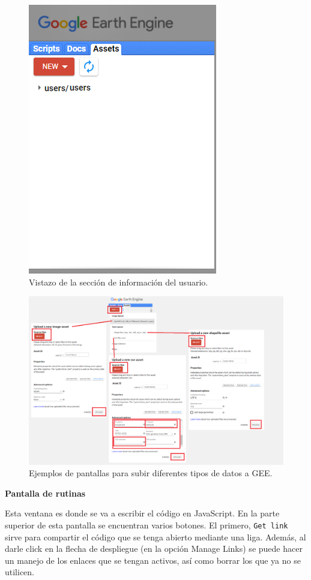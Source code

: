 \documentclass[
  12pt,
  letterpaper,
  twoside]{book}
\begin{document}
\begin{figure}

{\centering \includegraphics[width=0.4\linewidth]{Img/assets} 

}

\caption{Vistazo de la sección de información del usuario.}\label{fig:unnamed-chunk-12}
\end{figure}

\begin{figure}

{\centering \includegraphics[width=1\linewidth]{Img/newAssets} 

}

\caption{Ejemplos de pantallas para subir diferentes tipos de datos a GEE.}\label{fig:unnamed-chunk-13}
\end{figure}

\textbf{Pantalla de rutinas}

Esta ventana es donde se va a escribir el código en JavaScript. En la parte superior de esta pantalla se encuentran varios botones. El primero, \texttt{Get\ link} sirve para compartir el código que se tenga abierto mediante una liga. Además, al darle click en la flecha de despliegue (en la opción Manage Links) se puede hacer un manejo de los enlaces que se tengan activos, así como borrar los que ya no se utilicen.
\end{document}
